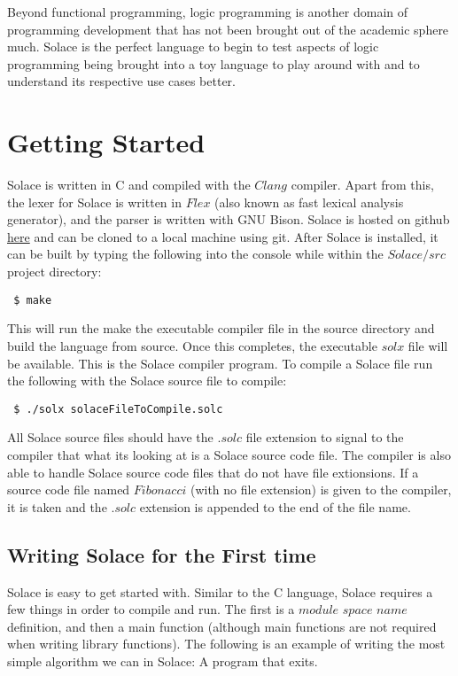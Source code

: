 \documentclass{article}
\begin{document}
Beyond functional programming, logic programming is another domain of programming development that has not been brought out
of the academic sphere much. Solace is the perfect language to begin to test aspects of logic programming being brought into a
toy language to play around with and to understand its respective use cases better.


\section{Getting Started}
Solace is written in C and compiled with the $Clang$ compiler. Apart from this, the lexer for Solace is written in $Flex$
(also known as fast lexical analysis generator), and the parser is written with GNU Bison. Solace is hosted on github
\href{https://github.com/JustSomeCarbon/Solace/tree/main}{here} and can be cloned to a local machine using git. After
Solace is installed, it can be built by typing the following into the console while within the $Solace/src$ project directory:

\begin{lstlisting}
 $ make
\end{lstlisting}

This will run the make the executable compiler file in the source directory and build the language from source.
Once this completes, the executable $solx$ file will be available. This is the Solace compiler program.
To compile a Solace file run the following with the Solace source file to compile:

\begin{lstlisting}
 $ ./solx solaceFileToCompile.solc
\end{lstlisting}

All Solace source files should have the $.solc$ file extension to signal to the compiler that what its looking at is a
Solace source code file. The compiler is also able to handle Solace source code files that do not have file extionsions.
If a source code file named $Fibonacci$ (with no file extension) is given to the compiler, it is taken and the $.solc$ extension
is appended to the end of the file name.

\subsection{Writing Solace for the First time}
Solace is easy to get started with. Similar to the C language, Solace requires a few things in order to compile
and run. The first is a $module$ $space$ $name$ definition, and then a main function (although main functions are not required when
writing library functions). The following is an example of writing the most simple algorithm we can in Solace: A program
that exits.
\end{document}
